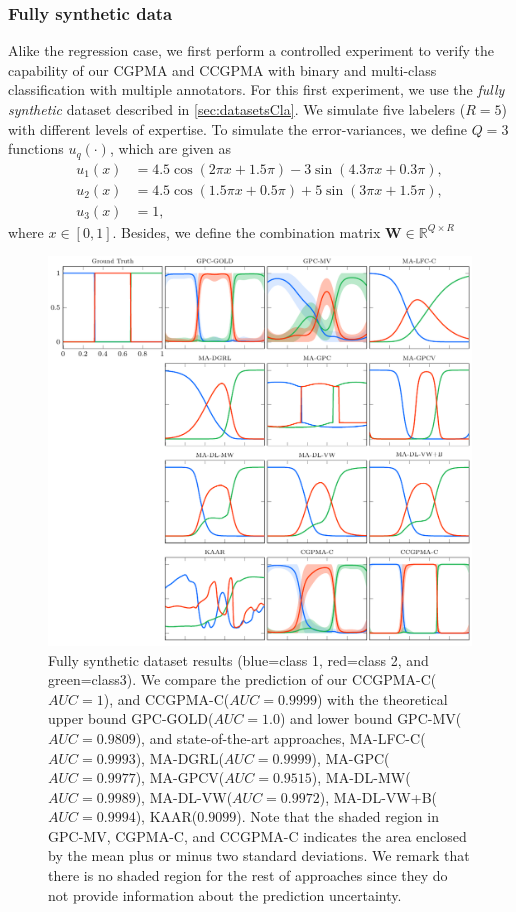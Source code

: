 \documentclass[journal]{IEEEtran}
\newcommand{\Real}{\mathbb{R}}
\newcommand{\boldW}{\mathbf{W}}
\begin{document}
\subsubsection{Fully synthetic data} Alike the regression case, we first perform a controlled experiment to verify the capability of our CGPMA and CCGPMA with binary and multi-class classification with multiple annotators. For this first experiment, we use the \textit{fully synthetic} dataset described in \cref{sec:datasetsCla}. We simulate five labelers ($R=5$) with different levels of expertise. To simulate the error-variances, we define $Q=3$ functions $u_q(\cdot)$, which are given as 
\begin{align}
\label{eq:u1c}
u_1(x) &= 4.5\cos(2\pi x + 1.5\pi) - 3\sin(4.3\pi x + 0.3\pi),\\
\label{eq:u2c}
u_2(x) &= 4.5\cos(1.5\pi x + 0.5\pi) + 5\sin(3\pi x + 1.5\pi),\\
\label{eq:u3c}
u_3(x) &= 1,
\end{align}
where $x\in [0,1]$. Besides, we define the combination matrix $\boldW \in \Real^{Q\times R}$
\begin{figure}[!tb]
	\centering
% 	
	\includegraphics[width = \textwidth]{Figures/SinCla.pdf}
	\caption{Fully synthetic dataset results (blue=class 1, red=class 2, and green=class3). We compare the prediction of our CCGPMA-C($AUC=1$), and CCGPMA-C($AUC=0.9999$) with the theoretical upper bound GPC-GOLD($AUC=1.0$) and lower bound GPC-MV($AUC=0.9809$), and state-of-the-art approaches, MA-LFC-C($AUC=0.9993$), MA-DGRL($AUC=0.9999$),  MA-GPC($AUC=0.9977$), MA-GPCV($AUC=0.9515$), MA-DL-MW($AUC=0.9989$), MA-DL-VW($AUC=0.9972$), MA-DL-VW+B($AUC=0.9994$), KAAR($0.9099$). Note that the shaded region in GPC-MV, CGPMA-C, and CCGPMA-C indicates the area enclosed by the mean plus or minus two standard deviations. We remark that there is no shaded region for the rest of approaches since they do not provide information about the prediction uncertainty.}
	\label{fig:FSCla}
\end{figure}
\end{document}
